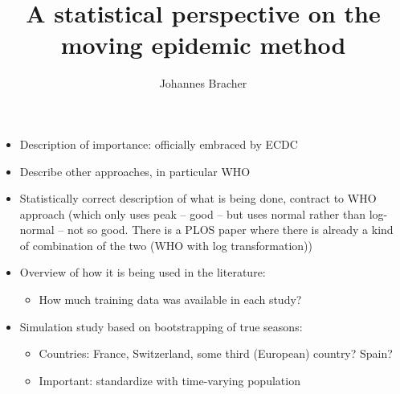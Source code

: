 \documentclass{article}
\begin{document}
\begin{itemize}
\item Description of importance: officially embraced by ECDC
\item Describe other approaches, in particular WHO
\item Statistically correct description of what is being done, contract to WHO approach (which only uses peak -- good -- but uses normal rather than log-normal -- not so good. There is a PLOS paper where there is already a kind of combination of the two (WHO with log transformation))
\item Overview of how it is being used in the literature:
\begin{itemize}
\item How much training data was available in each study?
\end{itemize}
\item Simulation study based on bootstrapping of true seasons:
\begin{itemize}
\item Countries: France, Switzerland, some third (European) country? Spain?
\item Important: standardize with time-varying population
\end{itemize}
\end{itemize}

\title{A statistical perspective on the moving epidemic method }
\author{Johannes Bracher}
\maketitle





\end{document}

